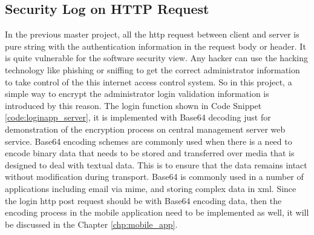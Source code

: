 \subsection{Security Log on HTTP Request}
\par In the previous master project, all the \gls{http} request between client and server is pure string with the authentication information in the request body or header. It is quite vulnerable for the software security view. Any hacker can use the hacking technology like phishing or sniffing to get the correct administrator information to take control of the this internet access control system. So in this project, a simple way to encrypt the administrator login validation information is introduced by this reason. The login function shown in Code Snippet \ref{code:loginapp_server}, it is implemented with Base64\cite{base64} decoding just for demonstration of the encryption process on central management server web service. Base64 encoding schemes are commonly used when there is a need to encode binary data that needs to be stored and transferred over media that is designed to deal with textual data. This is to ensure that the data remains intact without modification during transport. Base64 is commonly used in a number of applications including email via \gls{mime}, and storing complex data in \gls{xml}. Since the login \gls{http} post request should be with Base64 encoding data, then the encoding process in the mobile application need to be implemented as well, it will be discussed in the Chapter \ref{chp:mobile_app}.

